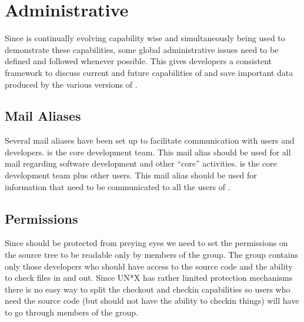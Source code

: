 
\chapter{Administrative}
\label{Administrative}

Since \parflow{} is continually evolving capability wise and
simultaneously being used to demonstrate these capabilities,
some global administrative issues need to be defined and followed
whenever possible.  This gives developers a consistent framework
to discuss current and future capabilities of \parflow{} and save
important data produced by the various versions of \parflow{}.


\section{Mail Aliases}
\label{Mail Aliases}

Several \parflow{} mail aliases have been set up to facilitate
communication with users and developers.  
is the core development team.  This mail alias should be used for all
mail regarding software development and other ``core'' activities.
 is the core development team plus other users.
This mail alias should be used for information that need to be communicated
to all the users of \parflow{}.


\section{Permissions}
\label{Permissions}

Since \parflow{} should be protected from preying eyes we need to set
the permissions on the \parflow{} source tree to be readable only by
members of the  group.  The  group
contains only those developers who should have access to the source
code and the ability to check files in and out.  Since UN*X has rather
limited protection mechanisms there is no easy way to split the
checkout and checkin capabilities so users who need the source code
(but should not have the ability to checkin things) will have to go
through members of the
 group.

